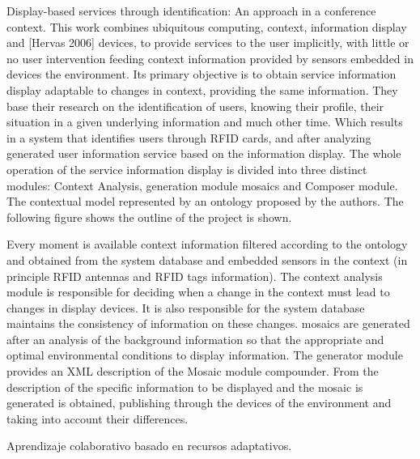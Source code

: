 	
Display-based services through identification: An approach in a conference context.
This work combines ubiquitous computing, context, information display and [Hervas 2006] devices, to provide services to the user implicitly, with little or no user intervention feeding context information provided by sensors embedded in devices the environment. Its primary objective is to obtain service information display adaptable to changes in context, providing the same information. They base their research on the identification of users, knowing their profile, their situation in a given underlying information and much other time. Which results in a system that identifies users through RFID cards, and after analyzing generated user information service based on the information display. The whole operation of the service information display is divided into three distinct modules: Context Analysis, generation module mosaics and Composer module. The contextual model represented by an ontology proposed by the authors. The following figure shows the outline of the project is shown.
 
Every moment is available context information filtered according to the ontology and obtained from the system database and embedded sensors in the context (in principle RFID antennas and RFID tags information). The context analysis module is responsible for deciding when a change in the context must lead to changes in display devices. It is also responsible for the system database maintains the consistency of information on these changes. mosaics are generated after an analysis of the background information so that the appropriate and optimal environmental conditions to display information. The generator module provides an XML description of the Mosaic module compounder. From the description of the specific information to be displayed and the mosaic is generated is obtained, publishing through the devices of the environment and taking into account their differences.

 
Aprendizaje colaborativo basado en recursos adaptativos.

